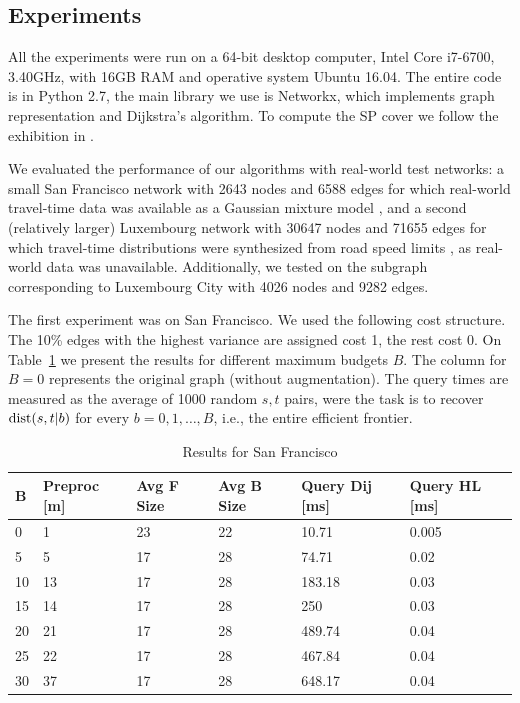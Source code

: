 \subsection{Experiments}

All the experiments were run on a 64-bit desktop computer, Intel Core i7-6700, 3.40GHz,  with 16GB RAM and operative system Ubuntu 16.04.
The entire code is in Python 2.7, the main library we use is Networkx, which implements graph representation and Dijkstra's algorithm.
To compute the SP cover we follow the exhibition in \cite{hubimplem}.

We evaluated the performance of our algorithms with real-world test networks: a small San Francisco network with 2643 nodes and 6588 edges for which real-world travel-time data was available as a Gaussian mixture model \cite{sf_data}, and a second (relatively larger) Luxembourg network with 30647 nodes and 71655 edges for which travel-time distributions were synthesized from road speed limits \cite{niknami2016tractable}, as real-world data was unavailable.
Additionally, we tested on the subgraph corresponding to Luxembourg City with 4026 nodes and 9282 edges.

The first experiment was on San Francisco.
We used the following cost structure.
The 10\% edges with the highest variance are assigned cost 1, the rest cost 0.
On Table~\ref{tab:sf_results} we present the results for different maximum budgets $B$.
The column for $B=0$ represents the original graph (without augmentation).
The query times are measured as the average of 1000 random $s,t$ pairs, were the task is to recover $\text{dist}(s,t|b)$ for every $b=0,1,\ldots,B$, i.e., the entire efficient frontier.

\begin{table}\caption{Results for San Francisco}\label{tab:sf_results}
\begin{center}
\begin{tabular}{ | l | p{1cm} | p{1cm} | p{1cm} | p{1.2cm} | p{1.2cm} | }
\hline
	B & Preproc [m] & Avg F Size & Avg B Size & Query Dij [ms] & Query HL [ms] \\ \hline \hline
	0 & 1 & 23 & 22 & 10.71 & 0.005 \\ \hline
	5 & 5 & 17 & 28 & 74.71 & 0.02 \\ \hline
	10 & 13 & 17 & 28 & 183.18 & 0.03 \\ \hline
	15 & 14 & 17 & 28 & 250 & 0.03 \\ \hline
	20 & 21 & 17 & 28 & 489.74 & 0.04 \\ \hline
	25 & 22 & 17 & 28 & 467.84 & 0.04 \\ \hline
	30 & 37 & 17 & 28 & 648.17 & 0.04 \\ \hline
\end{tabular}
\end{center}
\end{table}
 
